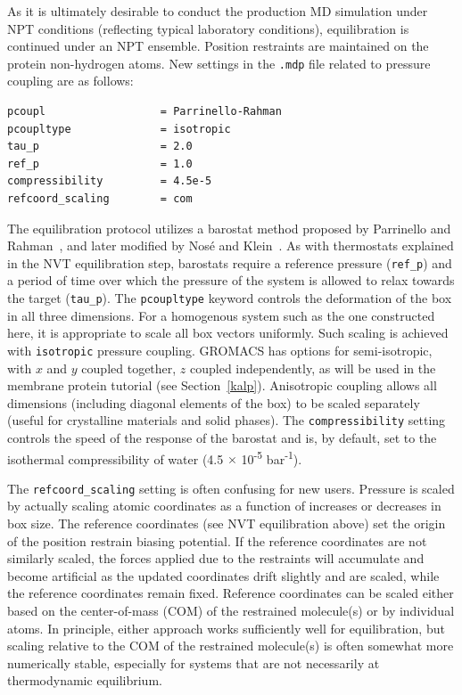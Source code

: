 \documentclass[9pt,tutorial,pubversion]{livecoms}
\begin{document}
As it is ultimately desirable to conduct the production MD simulation under NPT conditions (reflecting typical laboratory conditions), equilibration is continued under an NPT ensemble. Position restraints are maintained on the protein non-hydrogen atoms. New settings in the \texttt{.mdp} file related to pressure coupling are as follows:

\begin{lstlisting}
pcoupl                  = Parrinello-Rahman
pcoupltype              = isotropic
tau_p                   = 2.0
ref_p                   = 1.0
compressibility         = 4.5e-5
refcoord_scaling        = com
\end{lstlisting}

The equilibration protocol utilizes a barostat method proposed by Parrinello and Rahman~\cite{Parrinello1981}, and later modified by Nos\'e and Klein~\cite{Nose1983}. As with thermostats explained in the NVT equilibration step, barostats require a reference pressure (\texttt{ref\_p}) and a period of time over which the pressure of the system is allowed to relax towards the target (\texttt{tau\_p}). The \texttt{pcoupltype} keyword controls the deformation of the box in all three dimensions. For a homogenous system such as the one constructed here, it is appropriate to scale all box vectors uniformly. Such scaling is achieved with \texttt{isotropic} pressure coupling. GROMACS has options for semi-isotropic, with $x$ and $y$ coupled together, $z$ coupled independently, as will be used in the membrane protein tutorial (see Section~\ref{kalp}). Anisotropic coupling allows all dimensions (including diagonal elements of the box) to be scaled separately (useful for crystalline materials and solid phases). The \texttt{compressibility} setting controls the speed of the response of the barostat and is, by default, set to the isothermal compressibility of water (4.5 $\times$ 10\textsuperscript{-5} bar\textsuperscript{-1}). 

The \texttt{refcoord\_scaling} setting is often confusing for new users. Pressure is scaled by actually scaling atomic coordinates as a function of increases or decreases in box size. The reference coordinates (see NVT equilibration above) set the origin of the position restrain biasing potential. If the reference coordinates are not similarly scaled, the forces applied due to the restraints will accumulate and become artificial as the updated coordinates drift slightly and are scaled, while the reference coordinates remain fixed. Reference coordinates can be scaled either based on the center-of-mass (COM) of the restrained molecule(s) or by individual atoms. In principle, either approach works sufficiently well for equilibration, but scaling relative to the COM of the restrained molecule(s) is often somewhat more numerically stable, especially for systems that are not necessarily at thermodynamic equilibrium.
\end{document}
